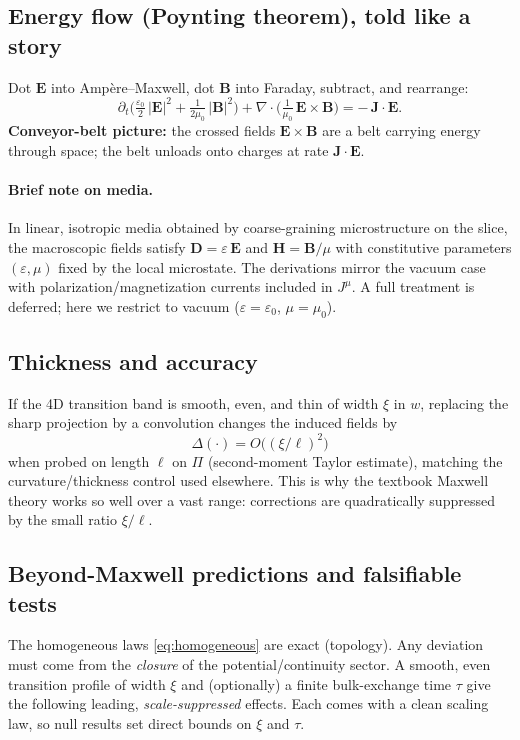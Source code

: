 \subsection{Energy flow (Poynting theorem), told like a story}
Dot $\mathbf E$ into Amp\`ere–Maxwell, dot $\mathbf B$ into Faraday, subtract, and rearrange:
\[
\partial_t \Big(\tfrac{\varepsilon_0}{2}\,|\mathbf E|^2 + \tfrac{1}{2\mu_0}\,|\mathbf B|^2\Big)
+ \nabla\!\cdot\!\Big(\tfrac{1}{\mu_0}\,\mathbf E\times \mathbf B\Big)
= -\,\mathbf J\!\cdot\!\mathbf E.
\]
\textbf{Conveyor-belt picture:} the crossed fields $\mathbf E\times\mathbf B$ are a belt carrying energy through space; the belt unloads onto charges at rate $\mathbf J\!\cdot\!\mathbf E$.

\paragraph{Brief note on media.}
In linear, isotropic media obtained by coarse-graining microstructure on the slice, the macroscopic fields satisfy $\mathbf D=\varepsilon\,\mathbf E$ and $\mathbf H=\mathbf B/\mu$ with constitutive parameters $(\varepsilon,\mu)$ fixed by the local microstate. The derivations mirror the vacuum case with polarization/magnetization currents included in $J^\mu$. A full treatment is deferred; here we restrict to vacuum ($\varepsilon=\varepsilon_0$, $\mu=\mu_0$).

\subsection{Thickness and accuracy}
If the 4D transition band is smooth, even, and thin of width $\xi$ in $w$, replacing the sharp projection by a convolution changes the induced fields by
\[
\Delta(\cdot)=O\!\big((\xi/\ell)^2\big)
\]
when probed on length $\ell$ on $\Pi$ (second-moment Taylor estimate), matching the curvature/thickness control used elsewhere. This is why the textbook Maxwell theory works so well over a vast range: corrections are quadratically suppressed by the small ratio $\xi/\ell$.

\subsection{Beyond-Maxwell predictions and falsifiable tests}
\label{subsec:EM_predictions}
The homogeneous laws \eqref{eq:homogeneous} are exact (topology). Any deviation must come from the \emph{closure} of the potential/continuity sector. A smooth, even transition profile of width $\xi$ and (optionally) a finite bulk-exchange time $\tau$ give the following leading, \emph{scale-suppressed} effects. Each comes with a clean scaling law, so null results set direct bounds on $\xi$ and $\tau$.


